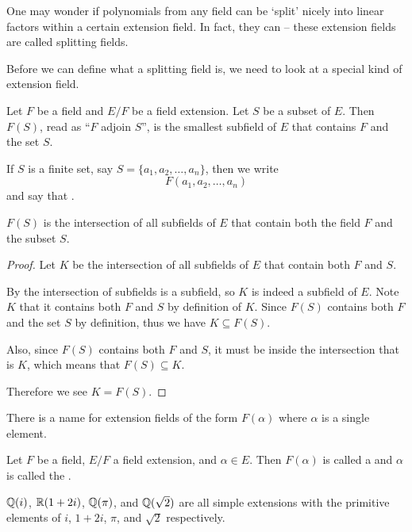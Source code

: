 One may wonder if polynomials from any field can be `split' nicely into linear factors within a certain extension field. In fact, they can -- these extension fields are called splitting fields.

Before we can define what a splitting field is, we need to look at a special kind of extension field.

\begin{definition}
    Let $F$ be a field and $E/F$ be a field extension. Let $S$ be a subset of $E$. Then $F(S)$, read as ``$F$ adjoin $S$'', is the smallest subfield of $E$ that contains $F$ and the set $S$.

    If $S$ is a finite set, say $S = \{a_1, a_2, \dots, a_n\}$, then we write
    \[
        F(a_1, a_2, \dots, a_n)
    \]
    and say that .
\end{definition}

\begin{proposition}
    $F(S)$ is the intersection of all subfields of $E$ that contain both the field $F$ and the subset $S$.
\end{proposition}
\begin{proof}
    Let $K$ be the intersection of all subfields of $E$ that contain both $F$ and $S$.

    By  the intersection of subfields is a subfield, so $K$ is indeed a subfield of $E$. Note $K$ that it contains both $F$ and $S$ by definition of $K$. Since $F(S)$ contains both $F$ and the set $S$ by definition, thus we have $K \subseteq F(S)$.

    Also, since $F(S)$ contains both $F$ and $S$, it must be inside the intersection that is $K$, which means that $F(S) \subseteq K$.

    Therefore we see $K = F(S)$.
\end{proof}

There is a name for extension fields of the form $F(\alpha)$ where $\alpha$ is a single element.

\begin{definition}
    Let $F$ be a field, $E/F$ a field extension, and $\alpha \in E$. Then $F(\alpha)$ is called a  and $\alpha$ is called the .
\end{definition}

\begin{example}
    $\mathbb{Q}(i)$, $\mathbb{R}(1+2i)$, $\mathbb{Q}(\pi)$, and $\mathbb{Q}(\sqrt 2)$ are all simple extensions with the primitive elements of $i$, $1+2i$, $\pi$, and $\sqrt 2$ respectively.
\end{example}

